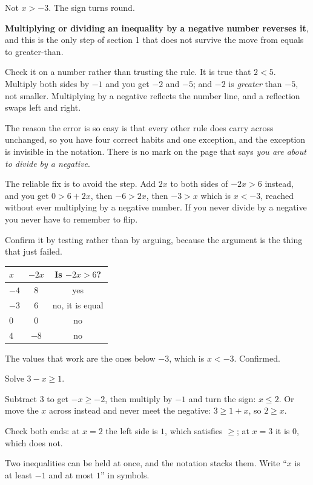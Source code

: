 \begin{fr}
Not $x > -3$. The sign turns round.

\begin{trapbox}
\textbf{Multiplying or dividing an inequality by a negative number reverses
it}, and this is the only step of section 1 that does not survive the move
from equals to greater-than.

Check it on a number rather than trusting the rule. It is true that $2 < 5$.
Multiply both sides by $-1$ and you get $-2$ and $-5$; and $-2$ is
\emph{greater} than $-5$, not smaller. Multiplying by a negative reflects the
number line, and a reflection swaps left and right.

The reason the error is so easy is that every other rule does carry across
unchanged, so you have four correct habits and one exception, and the
exception is invisible in the notation. There is no mark on the page that says
\emph{you are about to divide by a negative}.

The reliable fix is to avoid the step. Add $2x$ to both sides of $-2x > 6$
instead, and you get $0 > 6 + 2x$, then $-6 > 2x$, then $-3 > x$ \dash{} which
is $x < -3$, reached without ever multiplying by a negative number. If you
never divide by a negative you never have to remember to flip.
\end{trapbox}
\end{fr}

\begin{fr}
Confirm it by testing rather than by arguing, because the argument is the
thing that just failed.

\begin{center}
\begin{tabular}{lcc}
\toprule
$x$ & $-2x$ & Is $-2x > 6$? \\
\midrule
$-4$ & $8$ & yes \\
$-3$ & $6$ & no, it is equal \\
$0$ & $0$ & no \\
$4$ & $-8$ & no \\
\bottomrule
\end{tabular}
\end{center}

The values that work are the ones below $-3$, which is $x < -3$. Confirmed.

Solve $3 - x \ge 1$.
\nextframe
\end{fr}

\begin{fr}
Subtract $3$ to get $-x \ge -2$, then multiply by $-1$ and turn the sign:
$x \le 2$. Or move the $x$ across instead and never meet the negative:
$3 \ge 1 + x$, so $2 \ge x$.

Check both ends: at $x = 2$ the left side is $1$, which satisfies $\ge$; at
$x = 3$ it is $0$, which does not.

Two inequalities can be held at once, and the notation stacks them. Write
\enquote{$x$ is at least $-1$ and at most $1$} in symbols.
\nextframe
\end{fr}

